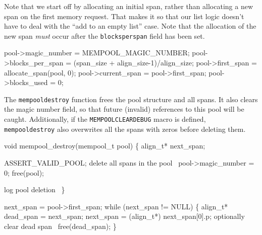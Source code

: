 Note that we start off by allocating an initial span, rather than
allocating a new span on the first memory request.  That makes it
so that our list logic doesn't have to deal with the ``add to an
empty list'' case.  Note that the allocation of the new span
\emph{must} occur after the {\tt{}blocks{}per{}span} field has been set.

\nwenddocs{}\endmoddef
pool->magic_number = MEMPOOL_MAGIC_NUMBER;
pool->blocks_per_span = (span_size + align_size-1)/align_size;
pool->first_span = allocate_span(pool, 0);
pool->current_span = pool->first_span;
pool->blocks_used = 0;
\nwendcode{}\nwdocspar

The {\tt{}mempool{}destroy} function frees the pool structure and all spans.
It also clears the magic number field, so that future (invalid)
references to this pool will be caught.
Additionally, if the {\tt{}MEMPOOL{}CLEAR{}DEBUG} macro is defined, 
{\tt{}mempool{}destroy} also overwrites all the spans with zeros 
before deleting them.

\nwenddocs{}\plusendmoddef
void mempool_destroy(mempool_t pool)
\{
    align_t* next_span;

    ASSERT_VALID_POOL;
    \LA{}delete all spans in the pool~{\nwtagstyle{}}\RA{}
    pool->magic_number = 0;
    free(pool);

    \LA{}log pool deletion~{\nwtagstyle{}}\RA{}
\}

\nwendcode{}\nwdocspar

\nwenddocs{}\endmoddef
next_span = pool->first_span;
while (next_span != NULL) \{
    align_t* dead_span = next_span;
    next_span = (align_t*) next_span[0].p;
    \LA{}optionally clear dead span~{\nwtagstyle{}}\RA{}
    free(dead_span);
\}
\nwendcode{}\nwdocspar

